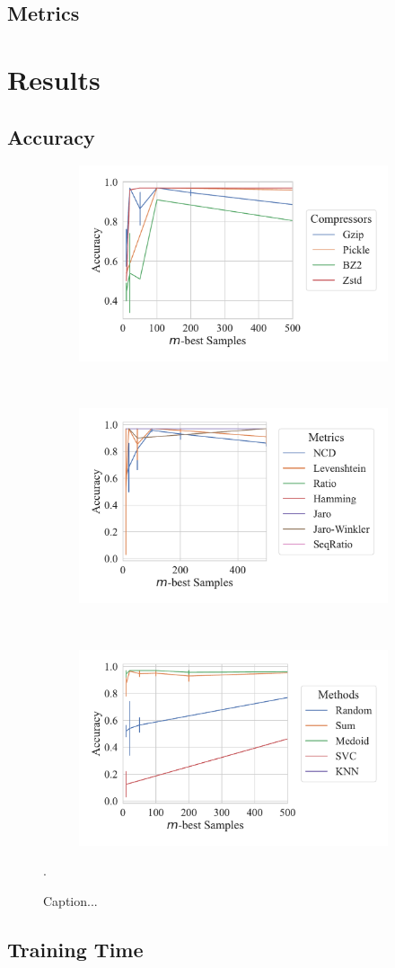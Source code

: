 \documentclass[sigconf]{acmart}
\begin{document}
\subsection{Metrics}
\label{metrics}
\label{methods}
\section{Results}

\subsection{Accuracy}

\begin{figure}
	\begin{subfigure}
		\centering
		\includegraphics[width=.32\textwidth]{figs/truthseeker/compressor_vs_accuracy.pdf}
	\end{subfigure}%
	~
	\begin{subfigure}
		\centering
		\includegraphics[width=.32\textwidth]{figs/truthseeker/metric_vs_accuracy.pdf}
	\end{subfigure}
	~
	\begin{subfigure}
		\centering
		\includegraphics[width=.32\textwidth]{figs/truthseeker/method_vs_accuracy.pdf}
	\end{subfigure}
	\caption{ Caption...}.
	\label{fig:accuracy}
\end{figure}

\subsection{Training Time}
\end{document}
